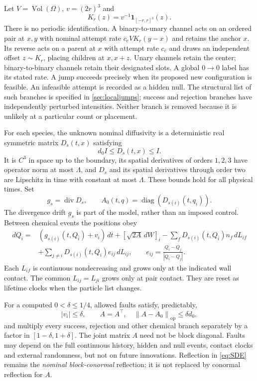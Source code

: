 \documentclass[11pt]{article}
\numberwithin{equation}{section}
\theoremstyle{definition}
\theoremstyle{remark}\newtheorem{remark}[theorem]{Remark}
\newcommand{\Vol}{\operatorname{Vol}}
\newcommand{\diag}{\operatorname{diag}}
\newcommand{\ind}{\mathbf 1}
\newcommand{\dt}{\,dt}
\newcommand{\dd}{\,d}
\newcommand{\norm}[1]{\left\|#1\right\|}
\begin{document}
Let $V=\Vol(\Omega)$, $v=(2r)^3$ and
\begin{equation}\label{eq:kernel}
 K_r(z)=v^{-1}\ind_{[-r,r]^3}(z).
\end{equation}
There is no periodic identification. A binary-to-unary channel acts on an
ordered pair at $x,y$ with nominal attempt rate $c_eVK_r(y-x)$ and retains
the anchor $x$. Its reverse acts on a parent at $x$ with attempt rate
$c_{\bar e}$ and draws an independent offset $z\sim K_r$, placing children
at $x,x+z$. Unary channels retain the center; binary-to-binary channels
retain their designated slots. A global $0\to0$ label has its stated rate.
A jump succeeds precisely when its proposed new configuration is feasible.
An infeasible attempt is recorded as a hidden null. The structural list of
such branches is specified in \cref{sec:localjumps}; success and rejection
branches have independently perturbed intensities. Neither branch is removed
because it is unlikely at a particular count or placement.

For each species, the unknown nominal diffusivity is a deterministic real
symmetric matrix $D_s(t,x)$ satisfying
\begin{equation}\label{eq:Dassumptions}
 d_0I\le D_s(t,x)\le I.
\end{equation}
It is $C^3$ in space up to the boundary, its spatial derivatives of orders
$1,2,3$ have operator norm at most $\Lambda$, and $D_s$ and its spatial
derivatives through order two are Lipschitz in time with constant at most
$\Lambda$. These bounds hold for all physical times. Set
\[
 g_s=\operatorname{div}D_s,\qquad
 A_0(t,q)=\diag(D_{s(i)}(t,q_i)).
\]
The divergence drift $g_s$ is part of the model, rather than an imposed
control. Between chemical events the positions obey
\begin{align}
 dQ_i={}&(g_{s(i)}(t,Q_i)+v_i)\dt+[\sqrt{2A}\dd W]_i
 -\sum_fD_{s(i)}(t,Q_i)n_f\dd L_{if}\nonumber\\
 &+\sum_{j\ne i}D_{s(i)}(t,Q_i)e_{ij}\dd L_{ij},
 \qquad e_{ij}=\frac{Q_i-Q_j}{|Q_i-Q_j|}.\label{eq:SDE}
\end{align}
Each $L_{if}$ is continuous nondecreasing and grows only at the indicated
wall contact. The common $L_{ij}=L_{ji}$ grows only at pair contact.
They are reset as lifetime clocks when the particle list changes.

For a computed $0<\delta\le1/4$, allowed faults satisfy, predictably,
\begin{equation}\label{eq:faults}
 |v_i|\le\delta,\qquad A=A^\top,\quad
 \norm{A-A_0}_{\mathrm{op}}\le\delta d_0,
\end{equation}
and multiply every success, rejection and other chemical branch separately
by a factor in $[1-\delta,1+\delta]$. The joint matrix $A$ need not be block
diagonal. Faults may depend on the full continuous history, hidden and null
events, contact clocks and external randomness, but not on future innovations.
Reflection in \eqref{eq:SDE} remains the \emph{nominal block-conormal}
reflection; it is not replaced by conormal reflection for $A$.
\end{document}
